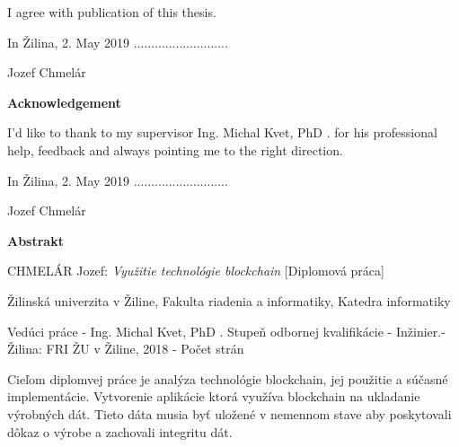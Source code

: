 I agree with publication of this thesis.

\vspace{2em}

In Žilina, 2. May 2019    \hfill ...........................

\hfill Jozef Chmelár \hspace{0,5em}

\pagebreak


\pagebreak
\hfill
\vfill

\begin{center}

\sc\Large\textbf{Acknowledgement}

\end{center}

I'd like to thank to my supervisor Ing. Michal Kvet, PhD . for his professional help, feedback and always pointing me to the right direction.

\vspace{2em}

In Žilina, 2. May 2019  \hfill ...........................

\hfill Jozef Chmelár \hspace{0,5em}

\pagebreak


\pagebreak

\begin{center}

\sc\Large\textbf{Abstrakt}
    
\end{center}

\noindent
{\sc CHMELÁR Jozef:} {\em Využitie technológie blockchain}
[Diplomová práca] 

\noindent
Žilinská univerzita v Žiline,  
Fakulta riadenia a informatiky,  
Katedra informatiky

\noindent  
Vedúci práce - Ing. Michal Kvet, PhD . Stupeň odbornej kvalifikácie - Inžinier.- Žilina: FRI ŽU v Žiline, 2018 - Počet strán \pageref{LastPage}
\noindent 



\vspace{1em}

Cieľom diplomvej práce je analýza technológie blockchain, jej použitie a súčasné implementácie. Vytvorenie aplikácie ktorá využíva blockchain na ukladanie výrobných dát. Tieto dáta musia byť uložené v nemennom stave aby poskytovali dôkaz o výrobe a zachovali integritu dát.

